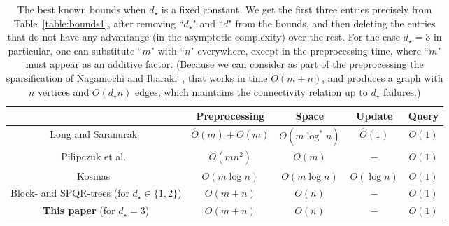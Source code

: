 \documentclass[11pt,a4paper]{article}
\begin{document}
\begin{table*}[h]
 \centering
 \hspace*{-0.6cm}
\renewcommand{\arraystretch}{1.3}
\begin{tabular}{ |c|c|c|c|c| } 
 \hline
 {} & Preprocessing & Space & Update & Query\\ \hline\hline
 {Long and Saranurak~\cite{DBLP:conf/focs/LongS22}} & $\hat{O}(m)+\tilde{O}(m)$ & $O(m\log^{*}{n})$ & $\hat{O}(1)$ & $O(1)$\\ \hline
 {Pilipczuk et al.~\cite{DBLP:conf/icalp/PilipczukSSTV22}} & $O(mn^2)$ & $O(m)$ & $-$ & $O(1)$\\ \hline
 {Kosinas~\cite{DBLP:conf/esa/Kosinas23}} & $O(m\log n)$ & $O(m\log n)$ & $O(\log n)$ & $O(1)$\\ \hline
 {Block- and SPQR-trees \cite{DBLP:journals/algorithmica/BattistaT96} (for $d_{\star}\in\{1,2\}$)} & $O(m+n)$ & $O(n)$ & $-$ & $O(1)$\\ \hline
 {\textbf{This paper} (for $d_{\star}=3$)}  & $O(m+n)$ & $O(n)$ & $-$ & $O(1)$\\ \hline
  
\end{tabular}
 \caption{The best known bounds when $d_{\star}$ is a fixed constant. We get the first three entries precisely from Table~\ref{table:bounds1}, after removing ``$d_{\star}$" and ``$d$" from the bounds, and then deleting the entries that do not have any advantange (in the asymptotic complexity) over the rest. For the case $d_{\star}=3$ in particular, one can substitute ``$m$" with ``$n$" everywhere, except in the preprocessing time, where ``$m$" must appear as an additive factor. (Because we can consider as part of the preprocessing the sparsification of Nagamochi and Ibaraki~\cite{DBLP:journals/algorithmica/NagamochiI92}, that works in time $O(m+n)$, and produces a graph with $n$ vertices and $O(d_{\star}n)$ edges, which maintains the connectivity relation up to $d_{\star}$ failures.) \label{table:bounds2}}
\end{table*} 
\end{document}
